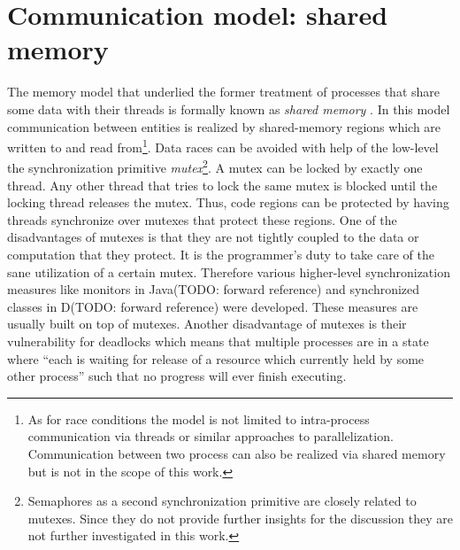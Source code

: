 \section{Communication model: shared memory}
The memory model that underlied the former treatment of processes that share some data with their threads is formally known as \textit{shared memory} . In this model communication between entities is realized by shared-memory regions which are written to and read from\cite[p.~138]{OperatingSystems_by_Haldar}\footnote{As for race conditions the model is not limited to intra-process communication via threads or similar approaches to parallelization. Communication between two process can also be realized via shared memory but is not in the scope of this work.}. Data races can be avoided with help of the low-level the synchronization primitive \textit{mutex}\footnote{Semaphores as a second synchronization primitive are closely related to mutexes. Since they do not provide further insights for the discussion they are not further investigated in this work.}. A mutex can be locked by exactly one thread. Any other thread that tries to lock the same mutex is blocked until the locking thread releases the mutex\cite{AdvancedLinuxProgramming}. Thus, code regions can be protected by having threads synchronize over mutexes that protect these regions. One of the disadvantages of mutexes is that they are not tightly coupled to the data or computation that they protect. It is the programmer's duty to take care of the sane utilization of a certain mutex. Therefore various higher-level synchronization measures like monitors in Java(TODO: forward reference) and synchronized classes in D(TODO: forward reference) were developed. These measures are usually built on top of mutexes\cite[p.~25]{TamingJavaThreads}. Another disadvantage of mutexes is their vulnerability for deadlocks which means that multiple processes are in a state where ``each is waiting for release of a resource which currently held by some other process''\cite[p.~119]{IntroductionToOperatingSystems} such that no progress will ever finish executing\cite[p.~2-3]{OperatingSystems_by_Dhotre}.

